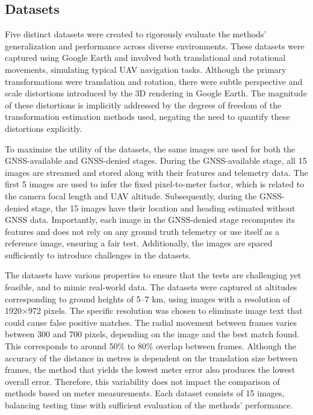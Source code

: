 \subsection{Datasets}

Five distinct datasets were created to rigorously evaluate the methods' generalization and performance across diverse environments. These datasets were captured using Google Earth and involved both translational and rotational movements, simulating typical UAV navigation tasks. Although the primary transformations were translation and rotation, there were subtle perspective and scale distortions introduced by the 3D rendering in Google Earth. The magnitude of these distortions is implicitly addressed by the degrees of freedom of the transformation estimation methods used, negating the need to quantify these distortions explicitly.

To maximize the utility of the datasets, the same images are used for both the GNSS-available and GNSS-denied stages. During the GNSS-available stage, all 15 images are streamed and stored along with their features and telemetry data. The first 5 images are used to infer the fixed pixel-to-meter factor, which is related to the camera focal length and UAV altitude. Subsequently, during the GNSS-denied stage, the 15 images have their location and heading estimated without GNSS data. Importantly, each image in the GNSS-denied stage recomputes its features and does not rely on any ground truth telemetry or use itself as a reference image, ensuring a fair test. Additionally, the images are spaced sufficiently to introduce challenges in the datasets.

The datasets have various properties to ensure that the tests are challenging yet feasible, and to mimic real-world data. The datasets were captured at altitudes corresponding to ground heights of 5–7 km, using images with a resolution of 1920×972 pixels. The specific resolution was chosen to eliminate image text that could cause false positive matches. The radial movement between frames varies between 300 and 700 pixels, depending on the image and the best match found. This corresponds to around 50\% to 80\% overlap between frames. Although the accuracy of the distance in metres is dependent on the translation size between frames, the method that yields the lowest meter error also produces the lowest overall error. Therefore, this variability does not impact the comparison of methods based on meter measurements. Each dataset consists of 15 images, balancing testing time with sufficient evaluation of the methods' performance.

